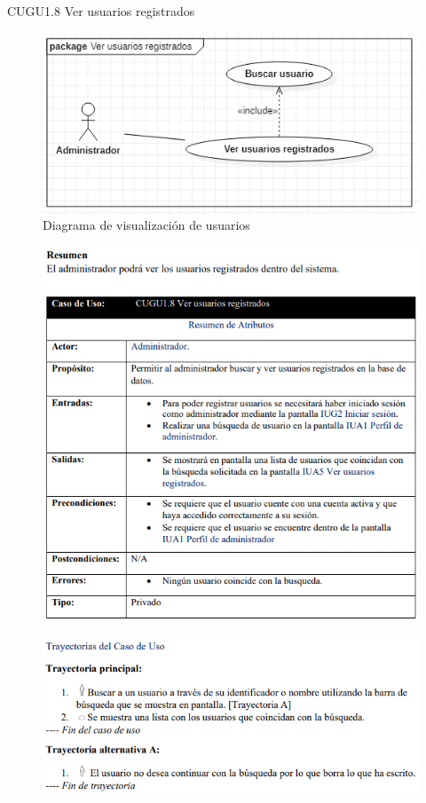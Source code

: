 \documentclass[12pt,letterpaper]{article}
\begin{document}
            \newpage
            CUGU1.8 Ver usuarios registrados 
            \begin{figure}[H]
                \centering
                \includegraphics [scale=0.6]{casosUso/verUsuario}
                \caption{Diagrama de visualización de usuarios}
            \end{figure}
            \begin{figure}[H]
                \centering
                \includegraphics [scale=0.8]{specs/specVerUsuario}
            \end{figure}
            \begin{figure}[H]
                \centering
                \includegraphics [scale=0.9]{specs/trayVerUsuario}
            \end{figure}
\end{document}
